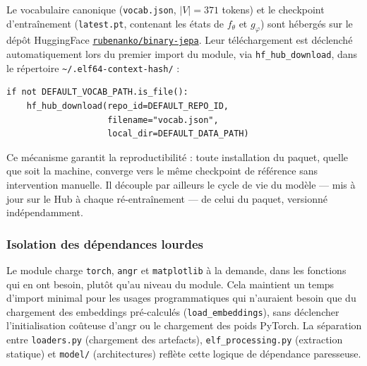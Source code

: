 Le vocabulaire canonique (\texttt{vocab.json}, $|V| = 371$ tokens) et le checkpoint
d'entraînement (\texttt{latest.pt}, contenant les états de $f_\theta$ et $g_\varphi$)
sont hébergés sur le dépôt HuggingFace \href{https://huggingface.co/rubenanko/binary-jepa/tree/main}{\texttt{rubenanko/binary-jepa}}. Leur
téléchargement est déclenché automatiquement lors du premier import du module, via
\texttt{hf\_hub\_download}, dans le répertoire \texttt{\textasciitilde/.elf64-context-hash/} :

\begin{verbatim}
if not DEFAULT_VOCAB_PATH.is_file():
    hf_hub_download(repo_id=DEFAULT_REPO_ID,
                    filename="vocab.json",
                    local_dir=DEFAULT_DATA_PATH)
\end{verbatim}

Ce mécanisme garantit la reproductibilité : toute installation du paquet, quelle que
soit la machine, converge vers le même checkpoint de référence sans intervention
manuelle. Il découple par ailleurs le cycle de vie du modèle — mis à jour sur le Hub à
chaque ré-entraînement — de celui du paquet, versionné indépendamment.

\subsubsection{Isolation des dépendances lourdes}

Le module charge \texttt{torch}, \texttt{angr} et \texttt{matplotlib} à la demande,
dans les fonctions qui en ont besoin, plutôt qu'au niveau du module. Cela maintient un
temps d'import minimal pour les usages programmatiques qui n'auraient besoin que du
chargement des embeddings pré-calculés (\texttt{load\_embeddings}), sans déclencher
l'initialisation coûteuse d'angr ou le chargement des poids PyTorch. La séparation
entre \texttt{loaders.py} (chargement des artefacts), \texttt{elf\_processing.py}
(extraction statique) et \texttt{model/} (architectures) reflète cette logique de
dépendance paresseuse.
